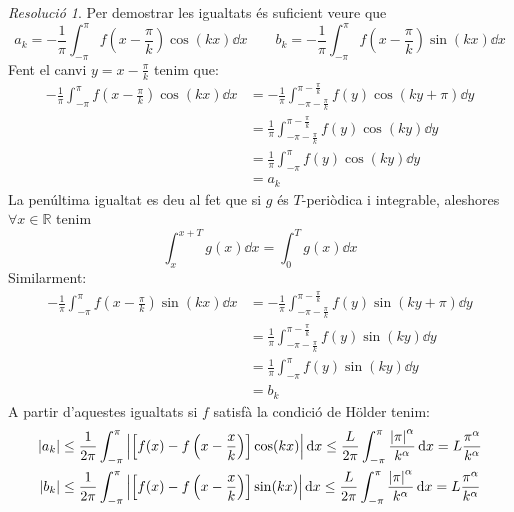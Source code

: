 \documentclass[10pt,a4paper]{article}
\newcommand{\RR}{\ensuremath{\mathbb{R}}} %
\theoremstyle{definition}
\theoremstyle{remark}
\newtheorem*{res}{Resolució}
\begin{document}
\begin{res}
  Per demostrar les igualtats és suficient veure que $$a_k=-\frac{1}{\pi}\int_{-\pi}^\pi f\left(x-\frac{\pi}{k}\right)\cos(kx)\dd{x}\qquad b_k=-\frac{1}{\pi}\int_{-\pi}^\pi f\left(x-\frac{\pi}{k}\right)\sin(kx)\dd{x}$$
  Fent el canvi $y=x-\frac{\pi}{k}$ tenim que:
  \begin{align*}
    -\frac{1}{\pi}\int_{-\pi}^\pi f\left(x-\frac{\pi}{k}\right)\cos(kx)\dd{x} & = -\frac{1}{\pi}\int_{-\pi-\frac{\pi}{k}}^{\pi-\frac{\pi}{k}} f(y)\cos(ky+\pi)\dd{y} \\
                                                                              & =\frac{1}{\pi}\int_{-\pi-\frac{\pi}{k}}^{\pi-\frac{\pi}{k}} f(y)\cos(ky)\dd{y}       \\
                                                                              & =\frac{1}{\pi}\int_{-\pi}^{\pi} f(y)\cos(ky)\dd{y}                                   \\
                                                                              & =a_k
  \end{align*}
  La penúltima igualtat es deu al fet que si $g$ és $T$-periòdica i integrable, aleshores $\forall x\in\RR$ tenim $$\int_x^{x+T}g(x)\dd{x}=\int_0^{T}g(x)\dd{x}$$
  Similarment:
  \begin{align*}
    -\frac{1}{\pi}\int_{-\pi}^\pi f\left(x-\frac{\pi}{k}\right)\sin(kx)\dd{x} & = -\frac{1}{\pi}\int_{-\pi-\frac{\pi}{k}}^{\pi-\frac{\pi}{k}} f(y)\sin(ky+\pi)\dd{y} \\
                                                                              & =\frac{1}{\pi}\int_{-\pi-\frac{\pi}{k}}^{\pi-\frac{\pi}{k}} f(y)\sin(ky)\dd{y}       \\
                                                                              & =\frac{1}{\pi}\int_{-\pi}^{\pi} f(y)\sin(ky)\dd{y}                                   \\
                                                                              & =b_k
  \end{align*}
  A partir d'aquestes igualtats si $f$ satisfà la condició de Hölder tenim:
  \begin{align*}
    \abs{a_k} & \leq\frac{1}{2\pi}\int_{-\pi}^\pi\abs{\left[f(x)-f\left(x-\frac{x}{k}\right)\right]\cos(kx)}\dd{x}\leq \frac{L}{2\pi}\int_{-\pi}^\pi\frac{\abs{\pi}^\alpha}{k^\alpha}\dd{x}= L\frac{\pi^\alpha}{k^\alpha} \\
    \abs{b_k} & \leq\frac{1}{2\pi}\int_{-\pi}^\pi\abs{\left[f(x)-f\left(x-\frac{x}{k}\right)\right]\sin(kx)}\dd{x}\leq \frac{L}{2\pi}\int_{-\pi}^\pi\frac{\abs{\pi}^\alpha}{k^\alpha}\dd{x}=L\frac{\pi^\alpha}{k^\alpha}  \\
  \end{align*}
\end{res}
\end{document}
